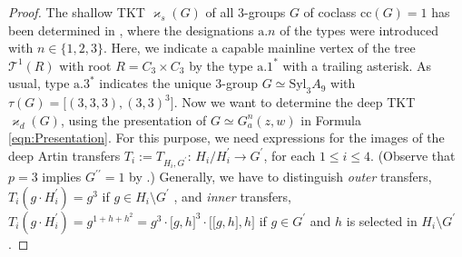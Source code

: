 \documentclass{amsart}
\theoremstyle{definition}
\numberwithin{equation}{section}
\begin{document}
\begin{proof}
The shallow TKT \(\varkappa_s(G)\) of all \(3\)-groups \(G\) of coclass \(\mathrm{cc}(G)=1\) has been determined in
\cite{Ma2},
where the designations \(\mathrm{a}.n\) of the types were introduced with \(n\in\lbrace 1,2,3\rbrace\).
Here, we indicate a capable mainline vertex of the tree \(\mathcal{T}^1(R)\) with root \(R=C_3\times C_3\)
\cite[Fig. 1--2, pp. 142--143]{Ma11b}
by the type \(\mathrm{a}.1^\ast\) with a trailing asterisk.
As usual, type \(\mathrm{a}.3^\ast\) indicates the unique \(3\)-group \(G\simeq\mathrm{Syl}_3A_9\)
with \(\tau(G)=\lbrack (3,3,3),(3,3)^3\rbrack\).
Now we want to determine the deep TKT \(\varkappa_d(G)\),
using the presentation of \(G\simeq G_a^n(z,w)\) in Formula
\eqref{eqn:Presentation}.
For this purpose, we need expressions for the images of the deep Artin transfers 
\(T_i:=T_{H_i,G^\prime}:\,H_i/H_i^\prime\to G^\prime\),
for each \(1\le i\le 4\). (Observe that \(p=3\) implies \(G^{\prime\prime}=1\) by
\cite{Bl1}.)
Generally, we have to distinguish
\textit{outer} transfers, \(T_i(g\cdot H_i^\prime)=g^3\) if \(g\in H_i\setminus G^\prime\)
\cite[Eqn. (4), p. 470]{Ma2},
and \textit{inner} transfers, \(T_i(g\cdot H_i^\prime)=g^{1+h+h^2}=g^3\cdot\lbrack g,h\rbrack^3\cdot\lbrack\lbrack g,h\rbrack,h\rbrack\)
if \(g\in G^\prime\) and \(h\) is selected in \(H_i\setminus G^\prime\)
\cite[Eqn. (6), p. 486]{Ma2}.


\end{proof}
\end{document}
